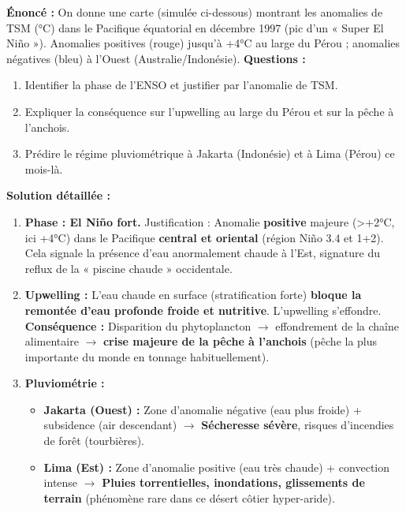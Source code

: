 \documentclass[11pt]{article}
\begin{document}
\begin{exoresolu}
\textbf{Énoncé :} On donne une carte (simulée ci-dessous) montrant les anomalies de TSM (°C) dans le Pacifique équatorial en décembre 1997 (pic d'un « Super El Niño »). Anomalies positives (rouge) jusqu'à +4°C au large du Pérou ; anomalies négatives (bleu) à l'Ouest (Australie/Indonésie).
\textbf{Questions :}
\begin{enumerate}
    \item Identifier la phase de l'ENSO et justifier par l'anomalie de TSM.
    \item Expliquer la conséquence sur l'upwelling au large du Pérou et sur la pêche à l'anchois.
    \item Prédire le régime pluviométrique à Jakarta (Indonésie) et à Lima (Pérou) ce mois-là.
\end{enumerate}
\tcblower
\textbf{Solution détaillée :}
\begin{enumerate}
    \item \textbf{Phase : El Niño fort.} Justification : Anomalie \textbf{positive} majeure (\textgreater +2°C, ici +4°C) dans le Pacifique \textbf{central et oriental} (région Niño 3.4 et 1+2). Cela signale la présence d'eau anormalement chaude à l'Est, signature du reflux de la « piscine chaude » occidentale.
    \item \textbf{Upwelling :} L'eau chaude en surface (stratification forte) \textbf{bloque la remontée d'eau profonde froide et nutritive}. L'upwelling s'effondre. \textbf{Conséquence :} Disparition du phytoplancton $\rightarrow$ effondrement de la chaîne alimentaire $\rightarrow$ \textbf{crise majeure de la pêche à l'anchois} (pêche la plus importante du monde en tonnage habituellement).
    \item \textbf{Pluviométrie :}
    \begin{itemize}
        \item \textbf{Jakarta (Ouest) :} Zone d'anomalie négative (eau plus froide) + subsidence (air descendant) $\rightarrow$ \textbf{Sécheresse sévère}, risques d'incendies de forêt (tourbières).
        \item \textbf{Lima (Est) :} Zone d'anomalie positive (eau très chaude) + convection intense $\rightarrow$ \textbf{Pluies torrentielles, inondations, glissements de terrain} (phénomène rare dans ce désert côtier hyper-aride).
    \end{itemize}
\end{enumerate}
\end{exoresolu}
\end{document}
